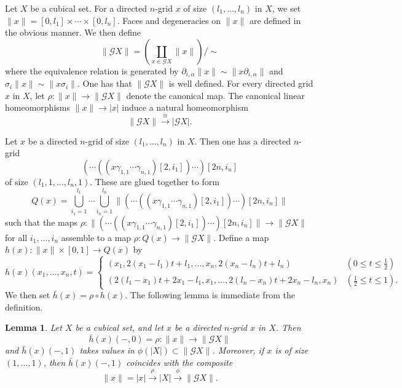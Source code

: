 \documentclass[oneside, 12pt]{amsart}
\numberwithin{equation}{section}
\theoremstyle{plain}
\newtheorem{lemma}[theorem]{Lemma}
\theoremstyle{definition}
\theoremstyle{remark}
\begin{document}
	
	
	Let $X$ be a cubical set. For a directed $n$-grid $x$ of size $(l_1,\ldots,l_n)$ in $X$, we set $\|x\|=[0,l_1]\times\cdots\times[0,l_n]$. Faces and degeneracies on $\|x\|$ are defined in the obvious manner. We then define
	\[
	\|\mathcal{G}X\|=\left(\coprod_{x\in\mathcal{G}X}\|x\|\right)/\sim
	\]
	where the equivalence relation is generated by $\partial_{i,\alpha}\|x\|\sim\|x\partial_{i,\alpha}\|$ and $\sigma_i\|x\|\sim\|x\sigma_i\|$. One has that $\|\mathcal{G}X\|$ is well defined. For every directed grid $x$ in $X$, let $\rho\colon\|x\|\to\|\mathcal{G}X\|$ denote the canonical map. The canonical linear homeomorphisms $\|x\|\to|x|$ induce a natural homeomorphism
	\begin{equation}
		\label{G homeo}
		\|\mathcal{G}X\|\xrightarrow{\cong}|\mathcal{G}X|.
	\end{equation}
	
	
	
	Let $x$ be a directed $n$-grid of size $(l_1,\ldots,l_n)$ in $X$. Then one has a directed $n$-grid
	\[
	(\cdots((x\gamma_{1,1}\cdots\gamma_{n,1})[2,i_1])\cdots)[2n,i_n]
	\]
	of size $(l_1,1,\ldots,l_n,1)$. These are glued together to form
	\[
	Q(x)=\bigcup_{i_1=1}^{l_1}\cdots\bigcup_{i_n=1}^{l_n}\|(\cdots((x\gamma_{1,1}\cdots\gamma_{n,1})[2,i_1])\cdots)[2n,i_n]\|
	\]
	such that the maps  $\rho\colon\|(\cdots((x\gamma_{1,1}\cdots\gamma_{n,1})[2,i_1])\cdots)[2n,i_n]\|\to\|\mathcal{G}X\|$ for all $i_1,\ldots,i_n$ assemble to a map $\rho\colon Q(x)\to\|\mathcal{G}X\|$. Define a map $h(x)\colon\|x\|\times[0,1]\to Q(x)$ by
	\[
	h(x)(x_1,\ldots,x_n,t)=
	\begin{cases}
		(x_1,2(x_1-l_1)t+l_1,\ldots,x_n,2(x_n-l_n)t+l_n)&(0\le t\le\frac{1}{2})\\
		(2(l_1-x_1)t+2x_1-l_1,x_1,\ldots,2(l_n-x_n)t+2x_n-l_n,x_n)&(\frac{1}{2}\le t\le 1).
	\end{cases}
	\]
	We then set $\bar{h}(x)=\rho\circ h(x)$. The following lemma is immediate from the definition.
	
	
	
	\begin{lemma}
		\label{G t=0,1}
		Let $X$ be a cubical set, and let $x$ be a directed $n$-grid $x$ in $X$. Then
		\[
		\bar{h}(x)(-,0)=\rho\colon\|x\|\to\|\mathcal{G}X\|
		\]
		and $\bar{h}(x)(-,1)$ takes values in $\phi(|X|)\subset\|\mathcal{G}X\|$. Moreover, if $x$ is of size $(1,\ldots,1)$, then $\bar{h}(x)(-,1)$ coincides with the composite
		\[
		\|x\|=|x|\xrightarrow{\rho}|X|\xrightarrow{\phi}\|\mathcal{G}X\|.
		\]
	\end{lemma}
	
\end{document}
